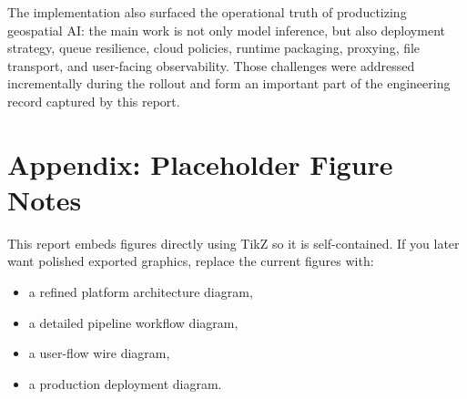 \documentclass[conference]{IEEEtran}
\begin{document}
The implementation also surfaced the operational truth of productizing
geospatial AI: the main work is not only model inference, but also deployment
strategy, queue resilience, cloud policies, runtime packaging, proxying, file
transport, and user-facing observability. Those challenges were addressed
incrementally during the rollout and form an important part of the engineering
record captured by this report.

\section*{Appendix: Placeholder Figure Notes}
This report embeds figures directly using TikZ so it is self-contained. If you
later want polished exported graphics, replace the current figures with:

\begin{itemize}[leftmargin=16pt]
\item a refined platform architecture diagram,
\item a detailed pipeline workflow diagram,
\item a user-flow wire diagram,
\item a production deployment diagram.
\end{itemize}
\end{document}
